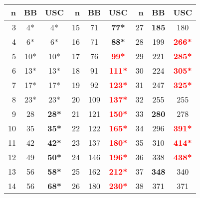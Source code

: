 \begin{table}[t]\scriptsize
\begin{tabular}{r|c|c||r|c|c||r|c|c}
 \hline
 n&BB &USC&n&BB&USC&n&BB&USC\\
 \hline
 3&4*&4*&    15&71&\textbf{77*}&
 27&\textbf{185}&180 \\
 4&6*&6*&    16&71&\textbf{88*}&
 28&199&\textbf{\textcolor{red}{266*}} \\
 5&10*&10*&    17&76&\textbf{\textcolor{red}{99*}}&
 29&221&\textbf{\textcolor{red}{285*}} \\
 6&13*&13*&    18&91&\textbf{\textcolor{red}{111*}}&
 30&224&\textbf{\textcolor{red}{305*}} \\
 7&17*&17*&    19&92&\textbf{\textcolor{red}{123*}}&
 31&247&\textbf{\textcolor{red}{325*}} \\
 8&23*&23*&    20&109&\textbf{\textcolor{red}{137*}}&
 32&255&255 \\
 9&28&\textbf{28*}&    21&121&\textbf{\textcolor{red}{150*}}&
 33&\textbf{280}&278 \\
 10&35&\textbf{35*}&    22&122&\textbf{\textcolor{red}{165*}}&
 34&296&\textbf{\textcolor{red}{391*}} \\
 11&42&\textbf{42*}&    23&137&\textbf{\textcolor{red}{180*}}&
 35&310&\textbf{\textcolor{red}{414*}} \\
 12&49&\textbf{50*}&    24&146&\textbf{\textcolor{red}{196*}}&
 36&338&\textbf{\textcolor{red}{438*}} \\
 13&56&\textbf{58*}&    25&162&\textbf{\textcolor{red}{212*}}&
 37&\textbf{348}&340 \\
 14&56&\textbf{68*}&    26&180&\textbf{\textcolor{red}{230*}}&
 38&371&371 \\ 
\end{tabular}
\end{table}
